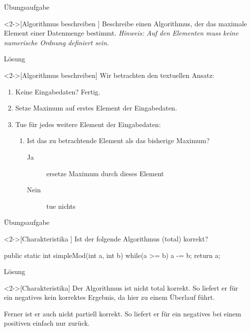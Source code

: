 \begin{frame}[c]{Übungsaufgabe}
    \begin{exercise}<2->[Algorithmus beschreiben ]
        Beschreibe einen Algorithmus, der das maximale Element einer Datenmenge bestimmt.\pause{}
        \textit{Hinweis: Auf den Elementen muss keine numerische Ordnung definiert sein.}
    \end{exercise}
\end{frame}

\begin{frame}[c]{Lösung}
    \begin{solve}<2->[Algorithmus beschreiben]
        \pause{}Wir betrachten den textuellen Ansatz: \begin{enumerate}[<+(1)->]
            \item Keine Eingabedaten?\pause{} Fertig.
            \item Setze Maximum auf erstes Element der Eingabedaten.
            \item Tue für jedes weitere Element der Eingabedaten: \begin{enumerate}
                \item Ist das zu betrachtende Element  als das bisherige Maximum? \begin{description}
                    \item[Ja] ersetze Maximum durch dieses Element
                    \item[Nein] tue nichts
                \end{description}
            \end{enumerate}
        \end{enumerate}
    \end{solve}
\end{frame}

\begin{frame}[c,fragile]{Übungsaufgabe}
    \begin{exercise}<2->[Charakteristika ]
        Ist der folgende Algorithmus (total) korrekt?\pause{}
        \begin{plainjava}
public static int simpleMod(int a, int b){
    while(a >= b)
        a -= b;
    return a;
}
        \end{plainjava}
    \end{exercise}
\end{frame}

\begin{frame}[c]{Lösung}
    \begin{solve}<2->[Charakteristika]
       \pause{}Der Algorithmus ist nicht total korrekt.\pause{} So liefert er für ein negatives  kein korrektes Ergebnis,\pause{} da hier  zu einem Überlauf führt.\pause{}\par{}
       Ferner ist er auch nicht partiell korrekt.\pause{} So liefert er für ein negatives  bei einem positiven  einfach nur  zurück.
    \end{solve}
\end{frame}

